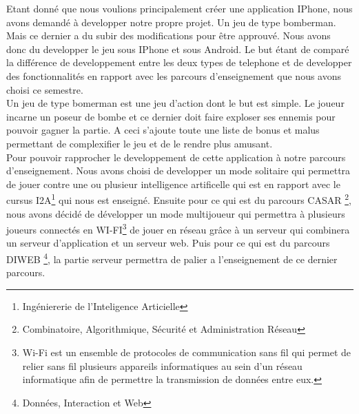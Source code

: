 
 Etant donné que nous voulions principalement créer une application IPhone, nous avons demandé à developper notre propre projet. Un jeu de type bomberman. Mais ce dernier a du subir des modifications pour être approuvé. Nous avons donc du developper le jeu sous IPhone et sous Android. Le but étant de comparé la différence de developpement entre les deux types de telephone et de developper des fonctionnalités en rapport avec les parcours d'enseignement que nous avons choisi ce semestre.\\
	
Un jeu de type bomerman est une jeu d'action dont le but est simple. Le joueur incarne un poseur de bombe et ce dernier doit faire exploser ses ennemis pour pouvoir gagner la partie. A ceci s'ajoute toute une liste de bonus et malus permettant de complexifier le jeu et de le rendre plus amusant.\\
	
Pour pouvoir rapprocher le developpement de cette application à notre parcours d'enseignement. Nous avons choisi de developper un mode solitaire qui permettra de jouer contre une ou plusieur intelligence artificelle qui est en rapport avec le cursus I2A\footnote{Ingéniererie de l'Inteligence Articielle} qui nous est enseigné. Ensuite pour ce qui est du parcours CASAR \footnote{Combinatoire, Algorithmique, Sécurité et Administration Réseau}, nous avons décidé de développer un mode multijoueur qui permettra à plusieurs joueurs connectés en WI-FI\footnote{Wi-Fi est un ensemble de protocoles de communication sans fil qui permet de relier sans fil plusieurs appareils informatiques au sein d'un réseau informatique afin de permettre la transmission de données entre eux.} de jouer en réseau grâce à un serveur qui combinera un serveur d'application et un serveur web. Puis pour ce qui est du parcours DIWEB \footnote{Données, Interaction et Web}, la partie serveur permettra de palier a l'enseignement de ce dernier parcours.
	
	

		
